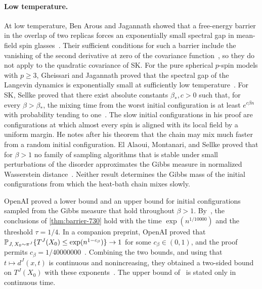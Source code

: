 \paragraph{Low temperature.}
At low temperature, Ben Arous and Jagannath showed that a free-energy barrier
in the overlap of two replicas forces an exponentially small spectral gap
in mean-field spin glasses~\cite[Theorem~1.3]{ben-arous-jagannath-2018}.
Their sufficient conditions for such a barrier include the vanishing of the
second derivative at zero of the covariance
function~\cite[Theorem~1.9]{ben-arous-jagannath-2018}, so they do not apply
to the quadratic covariance of SK. For the pure spherical $p$-spin models
with $p\ge3$, Gheissari and Jagannath proved that the spectral gap of the
Langevin dynamics is exponentially small at sufficiently low
temperature~\cite[Theorem~1]{gheissari-jagannath-2019}. For SK, Sellke proved
that there exist absolute constants $\beta_*,c>0$ such that, for every
$\beta>\beta_*$, the mixing time from the worst initial configuration is at
least $e^{c\beta n}$ with probability tending to
one~\cite[Theorem~1.1]{sellke-2025}. The slow initial configurations in his
proof are configurations at which almost every spin is aligned with its
local field by a uniform margin. He notes after his theorem that the chain may mix much
faster from a random initial configuration. El Alaoui, Montanari, and Sellke
proved that for $\beta>1$ no family of sampling algorithms that is stable
under small perturbations of the disorder approximates the Gibbs measure in
normalized Wasserstein distance~\cite[Theorem~2.6]{el-alaoui-montanari-sellke-sampling}.
Neither result determines the Gibbs mass of the initial configurations from
which the heat-bath chain mixes slowly.

OpenAI proved a lower bound and an upper bound for initial configurations
sampled from the Gibbs measure that hold throughout $\beta>1$.
By~\cite[Theorem~1.1]{oai-barriers}, the conclusions of \cref{thm:barrier-730}
hold with the time $\exp(n^{1/10000})$ and the threshold $\tau=1/4$. In a
companion preprint, OpenAI proved that
$\mathbb P_{J,\,X_0\sim\pi^J}\{T^J(X_0)\le\exp(n^{1-c_\beta})\}\to1$ for some
$c_\beta\in(0,1)$, and the proof permits
$c_\beta=1/40000000$~\cite[Theorem~1]{oai-typical-upper}. Combining the two
bounds, and using that $t\mapsto d^J(x,t)$ is continuous and nonincreasing,
they obtained a two-sided bound on $T^J(X_0)$ with these
exponents~\cite[Corollary~2]{oai-typical-upper}. The upper bound
of~\cite{oai-typical-upper} is stated only in continuous time.

